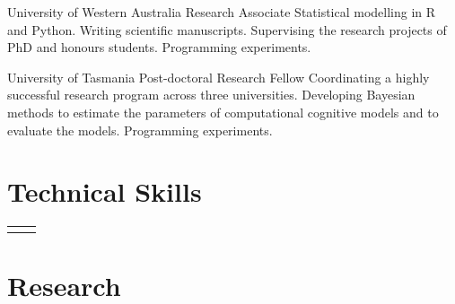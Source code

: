 \documentclass[10pt]{article} %
\begin{document}
\begin{paracol}{2}
{} %
{University of Western Australia} %
{Research Associate} %
{Statistical modelling in R and Python. Writing scientific manuscripts. Supervising the research projects of PhD and honours students. Programming experiments.} %

{} %
{University of Tasmania} %
{Post-doctoral Research Fellow} %
{Coordinating a highly successful research program across three universities. Developing Bayesian methods to estimate the parameters of computational cognitive models and to evaluate the models. Programming experiments.} %


      

\section{Technical Skills}

\begin{supertabular}{rl} %

	
	
	
	
	
	
\end{supertabular}


\section{Research}


\end{paracol}
\end{document}
